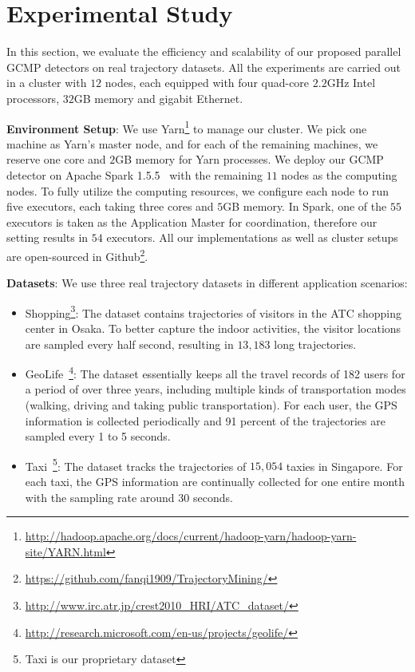 \section{Experimental Study}
\label{sec:exp}
In this section, we evaluate the efficiency and scalability of our proposed parallel GCMP detectors on real trajectory datasets. All the experiments are carried out in a cluster with $12$ nodes, each equipped with four quad-core $2.2$GHz Intel processors, $32$GB memory and gigabit Ethernet. 

\textbf{Environment Setup}: We use Yarn\footnote{\url{http://hadoop.apache.org/docs/current/hadoop-yarn/hadoop-yarn-site/YARN.html}} to manage our cluster. We pick one machine as Yarn's master node, and for each of the remaining machines, we reserve one core and $2$GB memory for Yarn processes. We deploy our GCMP detector on Apache Spark 1.5.5~\cite{zaharia2012resilient} with the remaining $11$ nodes as the computing nodes.
To fully utilize the computing resources, we configure each node to run five executors, each taking three cores and $5$GB memory. In Spark, one of the $55$ executors is taken as the Application Master for coordination, therefore our setting results in $54$ executors.
All our implementations as well as cluster setups are open-sourced in Github\footnote{\url{https://github.com/fanqi1909/TrajectoryMining/}}.

\textbf{Datasets}: We use three real trajectory datasets in different application scenarios:
\begin{itemize}
\item{Shopping}\footnote{\url{http://www.irc.atr.jp/crest2010_HRI/ATC_dataset/}}: The dataset contains
  trajectories of visitors in the ATC shopping center in Osaka. To better capture the indoor activities, the visitor locations are sampled every half second, resulting in $13,183$ long trajectories. 
\item{GeoLife}~\footnote{\url{http://research.microsoft.com/en-us/projects/geolife/}}: The dataset essentially keeps all the travel records of 182 users for a period
of over three years, including multiple kinds of transportation modes (walking, driving and taking public
transportation). For each user, the GPS information is collected periodically and 91 percent of the trajectories
are sampled every 1 to 5 seconds.
\item{Taxi}~\footnote{Taxi is our proprietary dataset}: The dataset tracks the trajectories of $15,054$ taxies in Singapore. For each taxi, the GPS information are continually collected for one entire month with the sampling rate around 30 seconds.
\end{itemize}



